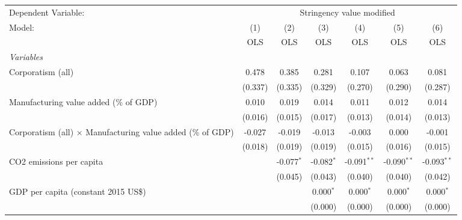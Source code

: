 
\begingroup
\centering
\begin{tabular}{lcccccc}
   \toprule
   Dependent Variable: & \multicolumn{6}{c}{Stringency value modified}\\
   Model:                                                             & (1)     & (2)          & (3)          & (4)           & (5)           & (6)\\  
                                                                      &  OLS    & OLS          & OLS          & OLS           & OLS           & OLS\\  
   \midrule
   \emph{Variables}\\
   Corporatism (all)                                                  & 0.478   & 0.385        & 0.281        & 0.107         & 0.063         & 0.081\\   
                                                                      & (0.337) & (0.335)      & (0.329)      & (0.270)       & (0.290)       & (0.287)\\   
   Manufacturing value added (\% of GDP)                              & 0.010   & 0.019        & 0.014        & 0.011         & 0.012         & 0.014\\   
                                                                      & (0.016) & (0.015)      & (0.017)      & (0.013)       & (0.014)       & (0.013)\\   
   Corporatism (all) $\times$ Manufacturing value added (\% of GDP)   & -0.027  & -0.019       & -0.013       & -0.003        & 0.000         & -0.001\\   
                                                                      & (0.018) & (0.019)      & (0.019)      & (0.015)       & (0.016)       & (0.015)\\   
   CO2 emissions per capita                                           &         & -0.077$^{*}$ & -0.082$^{*}$ & -0.091$^{**}$ & -0.090$^{**}$ & -0.093$^{**}$\\   
                                                                      &         & (0.045)      & (0.043)      & (0.040)       & (0.040)       & (0.042)\\   
   GDP per capita (constant 2015 US\$)                                &         &              & 0.000$^{*}$  & 0.000$^{*}$   & 0.000$^{*}$   & 0.000$^{*}$\\   
                                                                      &         &              & (0.000)      & (0.000)       & (0.000)       & (0.000)\\   

\end{tabular}
